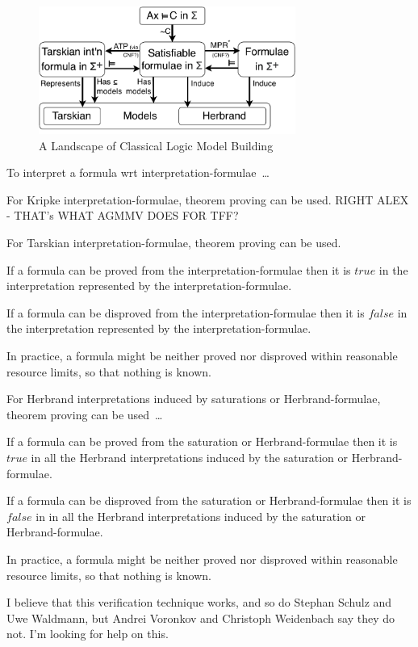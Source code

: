 \documentclass{easychair}
\newenvironment{packed_itemize}{
\vspace*{-0.3em}
\begin{itemize}
\setlength{\partopsep}{0pt}
\setlength{\itemsep}{1pt}
\setlength{\parskip}{0pt}
\setlength{\parsep}{0pt}
}{\end{itemize}}
\begin{document}
\begin{figure}[htbp]
\centering
\includegraphics[width=0.75\textwidth]{ModelLandscape.pdf}
\caption{A Landscape of Classical Logic Model Building}
\label{ModelLandscape}
\end{figure}

To interpret a formula wrt interpretation-formulae~\ldots
\begin{packed_itemize}
\item For Kripke interpretation-formulae, theorem proving can be used.
      RIGHT ALEX - THAT's WHAT AGMMV DOES FOR TFF?
\item For Tarskian interpretation-formulae, theorem proving can be used.
      \begin{packed_itemize}
      \item If a formula can be proved from the interpretation-formulae then it is $true$ in the 
            interpretation represented by the interpretation-formulae.
      \item If a formula can be disproved from the interpretation-formulae then it is $false$ in 
            the interpretation represented by the interpretation-formulae.
      \item In practice, a formula might be neither proved nor disproved within reasonable 
            resource limits, so that nothing is known.
      \end{packed_itemize}
\item For Herbrand interpretations induced by saturations or Herbrand-formulae, theorem proving 
      can be used~\ldots
      \begin{packed_itemize}
      \item If a formula can be proved from the saturation or Herbrand-formulae then it is 
            $true$ in all the Herbrand interpretations induced by the saturation or 
            Herbrand-formulae.
      \item If a formula can be disproved from the saturation or Herbrand-formulae then it is 
            $false$ in in all the Herbrand interpretations induced by the saturation or 
            Herbrand-formulae.
      \item In practice, a formula might be neither proved nor disproved within reasonable 
            resource limits, so that nothing is known.
      \end{packed_itemize}
      I believe that this verification technique works, and so do Stephan Schulz and Uwe Waldmann,
      but Andrei Voronkov and Christoph Weidenbach say they do not.
      I'm looking for help on this.
\end{packed_itemize}
\end{document}
